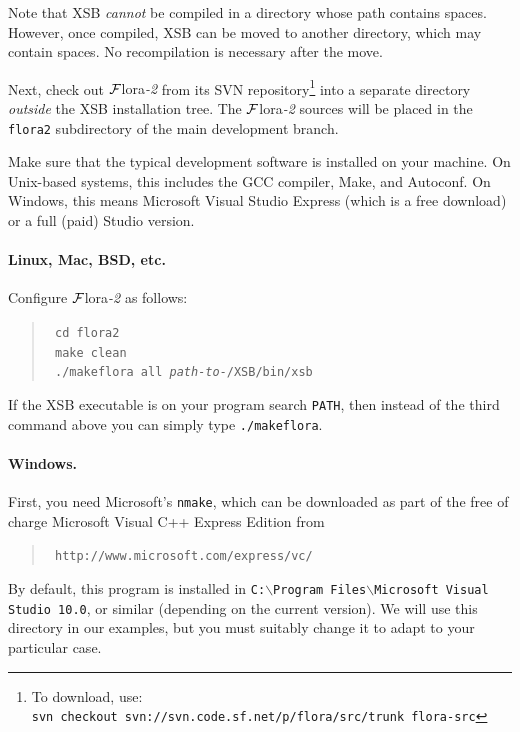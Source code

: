 \documentclass[11pt]{article}
\newcommand{\FLORA}{{\mbox{\sc ${\cal F}${lora}\rm\emph{-2}}}\xspace}
\newcommand{\FLSYSTEM}{\FLORA}
\begin{document}
{Note that XSB \emph{cannot} be compiled in a directory whose path contains
spaces.  However, once compiled, XSB can be moved to another directory,
which may contain spaces. No recompilation is necessary after the move.

\sloppy
Next, check out \FLSYSTEM from its SVN repository\footnote{
  To download, use:
\texttt{svn~checkout~svn://svn.code.sf.net/p/flora/src/trunk flora-src}
}
into a
separate directory \emph{outside} the XSB installation tree.  The \FLSYSTEM
sources will be placed in the {\tt flora2} subdirectory of the main
development branch.

Make sure that the typical development software is installed on your
machine. On Unix-based systems, this includes the GCC compiler, Make, and
Autoconf. On Windows, this means Microsoft Visual Studio Express (which is
a free download) or a full (paid) Studio version.

\paragraph{Linux, Mac, BSD, etc.}
Configure \FLSYSTEM as follows:
\begin{quote}
  \tt
   cd flora2\\
   \tt
   make clean\\
   \tt
   ./makeflora all \textnormal{\emph{path-to-}}/XSB/bin/xsb
\end{quote}
If the XSB executable is on your program search {\tt PATH}, then instead of the
third command above you can simply type
\texttt{./makeflora}. 

\paragraph{Windows.}
First, you need Microsoft's {\tt nmake}, which can be downloaded as
part of the free of charge Microsoft Visual C++ Express Edition from
\begin{quote}
\tt
  http://www.microsoft.com/express/vc/ 
\end{quote}
By default, this program is installed in
\texttt{C:$\backslash$Program Files$\backslash$Microsoft Visual Studio 10.0},
or similar (depending on the current version).
We will use this directory in our examples, but you must suitably 
change it to adapt to your particular case.

}
\end{document}
